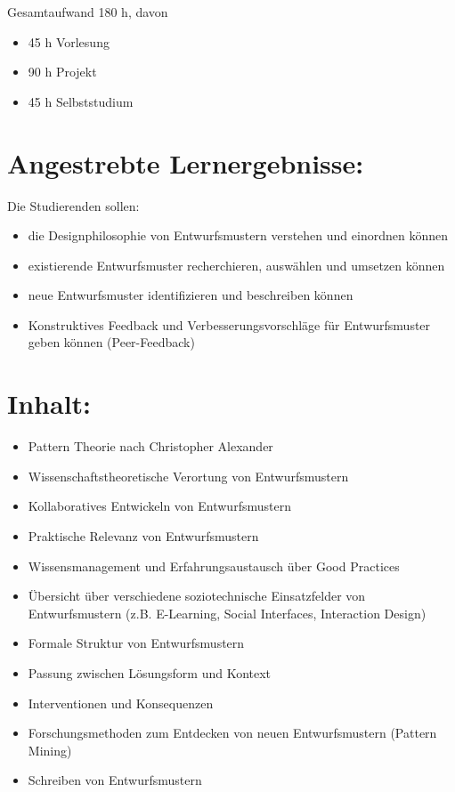 Gesamtaufwand 180 h, davon

\begin{itemize}
\item
  45 h Vorlesung
\item
  90 h Projekt
\item
  45 h Selbststudium
\end{itemize}

\section*{Angestrebte
Lernergebnisse:}\label{angestrebte-lernergebnisse-18}

Die Studierenden sollen:

\begin{itemize}
\item
  die Designphilosophie von Entwurfsmustern verstehen und einordnen
  können
\item
  existierende Entwurfsmuster recherchieren, auswählen und umsetzen
  können
\item
  neue Entwurfsmuster identifizieren und beschreiben können
\item
  Konstruktives Feedback und Verbesserungsvorschläge für Entwurfsmuster
  geben können (Peer-Feedback)
\end{itemize}

\section*{Inhalt:}\label{inhalt-18}

\begin{itemize}
\item
  Pattern Theorie nach Christopher Alexander
\item
  Wissenschaftstheoretische Verortung von Entwurfsmustern
\item
  Kollaboratives Entwickeln von Entwurfsmustern
\item
  Praktische Relevanz von Entwurfsmustern
\item
  Wissensmanagement und Erfahrungsaustausch über Good Practices
\item
  Übersicht über verschiedene soziotechnische Einsatzfelder von
  Entwurfsmustern (z.B. E-Learning, Social Interfaces, Interaction
  Design)
\item
  Formale Struktur von Entwurfsmustern
\item
  Passung zwischen Lösungsform und Kontext
\item
  Interventionen und Konsequenzen
\item
  Forschungsmethoden zum Entdecken von neuen Entwurfsmustern (Pattern
  Mining)
\item
  Schreiben von Entwurfsmustern
\end{itemize}

